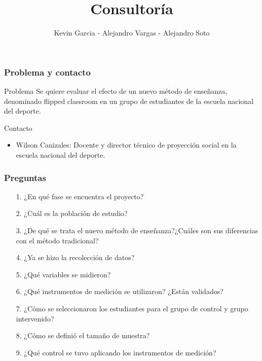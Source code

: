 \documentclass[12pt]{beamer}
\author{Kevin Garcia - Alejandro Vargas - Alejandro Soto}
\title{Consultoría}
\begin{document}
\justifying
\begin{frame}
\titlepage
\end{frame}


\begin{frame}
\frametitle{Problema y contacto}
\begin{block}{Problema}
\justifying
Se quiere evaluar el efecto de un nuevo método de enseñanza, denominado flipped classroom en un grupo de estudiantes de la escuela nacional del deporte. 
\end{block}
\begin{block}{Contacto}
\begin{itemize}
\item Wilson Canizales: Docente y director técnico de proyección social en la escuela nacional del deporte.
\end{itemize}
\end{block}
\end{frame}

\begin{frame}
\frametitle{Preguntas}
\begin{itemize}
\item[1.] ¿En qué fase se encuentra el proyecto?
\item[2.] ¿Cuál es la población de estudio?
\item[3.] ¿De qué se trata el nuevo método de enseñanza?¿Cuáles son sus diferencias con el método tradicional?
\item[4.] ¿Ya se hizo la recolección de datos?
\item[5.] ¿Qué variables se midieron?
\item[6.] ¿Qué instrumentos de medición se utilizaron? ¿Están validados?
\item[7.] ¿Cómo se seleccionaron los estudiantes para el grupo de control y grupo intervenido?
\item[8.] ¿Cómo se definió el tamaño de muestra?
\item[9.] ¿Qué control se tuvo aplicando los instrumentos de medición?
\end{itemize}
\end{frame}
\end{document}
